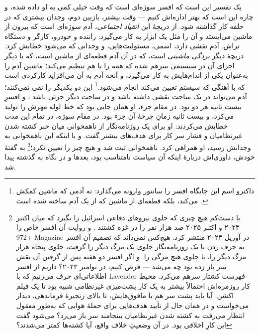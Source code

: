 یک تفسیر این است که افسر سوژه‌ای است که وقت خیلی کمی به او داده شده، و چاره این است که بهتر اداره‌اش کنیم — وقت بیشتر، بازبین دوم، وجدان بیشتری که در حلقه کار گذاشته شود. از دریچهٔ این \emph{انقیاد اجتماعی}، آدم سوژه‌ای است که بیرون از ماشین می‌ایستد و آن را مثل یک ابزار به کار می‌گیرد: راننده و خودرو، کارگر و دستگاه تراش. آدم نقشی دارد، اسمی، مسئولیت‌هایی، و وجدانی که می‌شود خطابش کرد. دریچهٔ دیگر \emph{بردگی ماشینی} است، که در آن آدم قطعه‌ای از ماشین است، که با دیگر اجزای آن در سیستمی سرهم شده که همه را با هم تنظیم می‌کند؛ ماشین آدم را به‌عنوان یکی از اندام‌هایش به کار می‌گیرد، و آنچه آدم به آن می‌افزاید کارکردی است که با آهنگی که سیستم تعیین می‌کند انجام می‌شود.\footnote{داکترو اسم این جایگاه افسر را سانتور وارونه می‌گذارد: نه آدمی که ماشین کمکش می‌کند، بلکه قطعه‌ای از ماشین که از یک آدم ساخته شده است \autocite{doctorow2026reversecentaur}.} این دو یکدیگر را نفی نمی‌کنند؛ آدم می‌تواند در یک ساحت نقشی داشته باشد و در ساحت دیگر جزئی باشد \autocite[فلات ۱۳، «The Apparatus of Capture»: بردگی آنجاست که خود انسان‌ها قطعه‌های سازندهٔ ماشینی‌اند که میان خودشان و با چیزهای دیگر می‌سازند، زیر کنترل و هدایت یک واحد برتر؛ و انقیاد آنجاست که آن واحد برتر انسان را به‌عنوان سوژه‌ای برمی‌سازد که به یک ابژهٔ بیرونیِ تازه پیوند خورده است، ابژه‌ای که می‌تواند یک حیوان، یک ابزار یا حتی یک ماشین باشد]{deleuze1987plateaus}، و افسرِ بیست ثانیه هر دو بود. در مقام جزء، او همان جایی بود که خط لوله مهرش را تولید می‌کرد، و بیست ثانیه زمانِ چرخهٔ آن جزء بود. در مقام سوژه، در تمام این مدت خطابش می‌کردند: او برای یک روزنامه‌نگار از ناهمخوانی میان خبر کشته شدن غیرنظامیان و فشار سر کار برای هدف‌های بیشتر گفت. و با اینکه این ناهمخوانی به وجدانش رسید، او همراهی کرد. ناهمخوانی ثبت شد و هیچ چیز را تعیین نکرد؛\footnote{یا دست‌کم هیچ چیزی که جلوی نیروهای دفاعی اسرائیل را بگیرد که میان اکتبر ۲۰۲۳ و اکتبر ۲۰۲۵ صد هزار نفر را در غزه کشتند \autocite{gomezugarte2025uncertainty,acosta2026gaza,economist2025gaza}. و روایت آن افسر خاص را \foreignlanguage{english}{+972 Magazine} در آوریل ۲۰۲۴ منتشر کرد. هیچ‌کس نمی‌داند که تصمیم آن افسر به حرف زدن با یک روزنامه‌نگار جلوی یک مرگ دیگر را گرفت، جلوی پنجاه هزار مرگ دیگر را، یا جلوی هیچ مرگی را. و اگر افسر دو هفته پس از گرفتن آن نقش سر باز زده بود چه می‌شد — فرض کنیم، در نوامبر ۲۰۲۳؟ داریم از افسر اطلاعاتی‌ای حرف می‌زنیم که با Lavender فهرست کشتار سرهم می‌کرد. محیط کار روزمره‌اش احتمالاً بیشتر به یک کار پشت‌میزی غیرنظامی شبیه بود تا یک فیلم اکشن. آیا باید پشت سر هم با مافوق‌هایش، تا بالای زنجیرهٔ فرماندهی، دیدار می‌خواست و در همان حال از تأیید هدف‌هایی برای حملهٔ هوایی که به‌طور معقول انتظار می‌رفت به کشته شدن غیرنظامیان بینجامند سر باز می‌زد؟ می‌شود گفت این کارِ اخلاقی بود. در آن وضعیتِ خلاف واقع، آیا کشته‌ها کمتر می‌شدند؟} به گفتهٔ خودش، داوری‌اش دربارهٔ اینکه آن سیاست نامتناسب بود، بعدها و در نگاه به گذشته پیدا شد.

